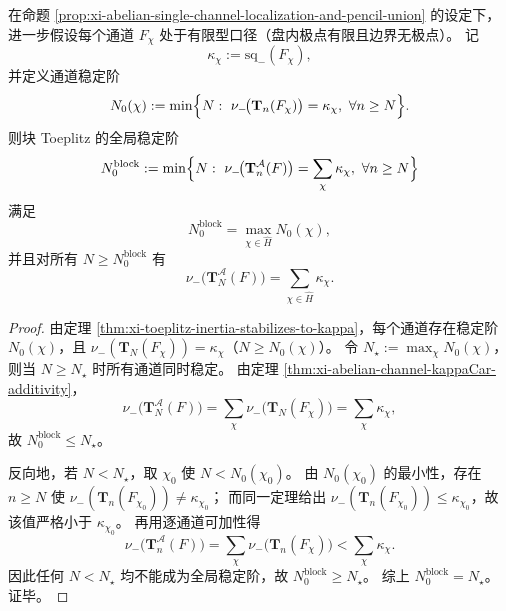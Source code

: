 \begin{theorem}\label{thm:xi-abelian-global-stability-threshold-max-channel}
在命题 \ref{prop:xi-abelian-single-channel-localization-and-pencil-union} 的设定下，进一步假设每个通道 \(F_\chi\) 处于有限型口径（盘内极点有限且边界无极点）。
记
\[
\kappa_\chi:=\mathrm{sq}_-(F_\chi),
\]
并定义通道稳定阶
\[
N_0(\chi):=\min\Bigl\{N:\ \nu_-\!\bigl(\mathbf T_n(F_\chi)\bigr)=\kappa_\chi,\ \forall n\ge N\Bigr\}.
\]
则块 Toeplitz 的全局稳定阶
\[
N_0^{\mathrm{block}}
:=\min\Bigl\{N:\ \nu_-\!\bigl(\mathbf T_n^{\mathcal A}(F)\bigr)=\sum_{\chi}\kappa_\chi,\ \forall n\ge N\Bigr\}
\]
满足
\[
N_0^{\mathrm{block}}=\max_{\chi\in\widehat H}N_0(\chi),
\]
并且对所有 \(N\ge N_0^{\mathrm{block}}\) 有
\[
\nu_-\!\bigl(\mathbf T_N^{\mathcal A}(F)\bigr)=\sum_{\chi\in\widehat H}\kappa_\chi.
\]
\end{theorem}
\begin{proof}
由定理 \ref{thm:xi-toeplitz-inertia-stabilizes-to-kappa}，每个通道存在稳定阶 \(N_0(\chi)\)，且
\(\nu_-(\mathbf T_N(F_\chi))=\kappa_\chi\)（\(N\ge N_0(\chi)\)）。
令 \(N_\star:=\max_\chi N_0(\chi)\)，则当 \(N\ge N_\star\) 时所有通道同时稳定。
由定理 \ref{thm:xi-abelian-channel-kappaCar-additivity}，
\[
\nu_-\!\bigl(\mathbf T_N^{\mathcal A}(F)\bigr)
=\sum_{\chi}\nu_-\!\bigl(\mathbf T_N(F_\chi)\bigr)
=\sum_{\chi}\kappa_\chi,
\]
故 \(N_0^{\mathrm{block}}\le N_\star\)。
\par
反向地，若 \(N<N_\star\)，取 \(\chi_0\) 使 \(N<N_0(\chi_0)\)。
由 \(N_0(\chi_0)\) 的最小性，存在 \(n\ge N\) 使
\(\nu_-(\mathbf T_n(F_{\chi_0}))\neq \kappa_{\chi_0}\)；
而同一定理给出 \(\nu_-(\mathbf T_n(F_{\chi_0}))\le \kappa_{\chi_0}\)，故该值严格小于 \(\kappa_{\chi_0}\)。
再用逐通道可加性得
\[
\nu_-\!\bigl(\mathbf T_n^{\mathcal A}(F)\bigr)
=\sum_{\chi}\nu_-\!\bigl(\mathbf T_n(F_\chi)\bigr)
<\sum_{\chi}\kappa_\chi.
\]
因此任何 \(N<N_\star\) 均不能成为全局稳定阶，故 \(N_0^{\mathrm{block}}\ge N_\star\)。
综上 \(N_0^{\mathrm{block}}=N_\star\)。证毕。
\end{proof}

